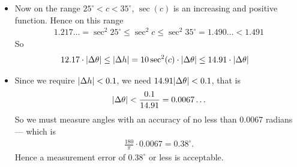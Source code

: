 \begin{eg}
\begin{itemize}
\item Now on the range $25^\circ < c < 35^\circ$, $\sec(c)$ is an increasing and
positive function. Hence on this range
\begin{align*}
  1.217\dots = \sec^2 25^\circ \leq \sec^2 c \leq \sec^2 35^\circ = 1.490\dots
< 1.491
\end{align*}
So
\begin{align*}
  12.17 \cdot |\Delta \theta| &\leq |\Delta h|
  = 10 \sec^2(c) \cdot |\Delta \theta| \leq 14.91 \cdot
  | \Delta \theta|
\end{align*}
\item Since we require $|\Delta h| < 0.1$, we need $14.91 |\Delta \theta| <0.1$, that
is
\begin{align*}
|\Delta \theta| < \frac{0.1}{14.91} = 0.0067\dots
\end{align*}
So we must measure angles with an accuracy of no less than $0.0067$ radians ---
which is
\begin{align*}
  \frac{180}{\pi} \cdot 0.0067 = 0.38^\circ.
\end{align*}
Hence a measurement error of $0.38^\circ$ or less is acceptable.

%
%
%

\end{itemize}
\end{eg}


